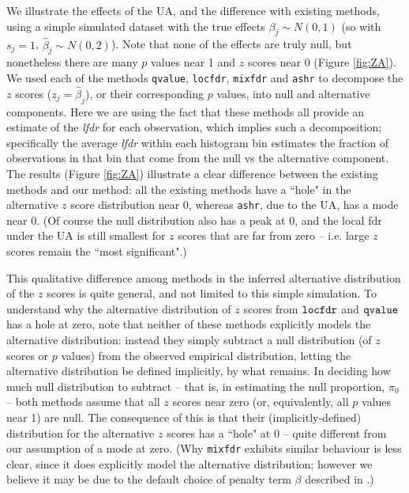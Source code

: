 \documentclass[11pt]{article}
\def\lfdr{\textit{lfdr}}
\def\bhat{\hat{\beta}}
\def\qvalue{{\tt qvalue}\xspace}
\def\locfdr{{\tt locfdr}\xspace}
\def\mixfdr{{\tt mixfdr}\xspace}
\def\ashr{{\tt ashr}\xspace}
\begin{document}
We illustrate the effects of the UA, and the difference with existing methods, using a simple simulated dataset
 with the true effects $\beta_j \sim N(0,1)$ (so with $s_j=1$, $\bhat_j  \sim N(0,2)$). Note that none of the effects are truly null,
but nonetheless there are many $p$ values near 1 and $z$ scores near 0 (Figure \ref{fig:ZA}).  We used each of the methods
\qvalue, \locfdr, \mixfdr and \ashr to decompose the $z$ scores ($z_j = \bhat_j$), or their corresponding $p$ values, into null and alternative components.
Here we are using the fact that these methods all provide an estimate of the \lfdr{} for each observation, which
implies such a decomposition;  specifically the average \lfdr{} within each histogram bin estimates the fraction of observations in that bin that come from the null vs the alternative component. The results (Figure \ref{fig:ZA}) illustrate a clear difference between the existing methods and our method:
all the existing methods have a ``hole"  in the alternative $z$ score distribution near 0, whereas \ashr, due to the UA, has a mode near 0.
(Of course the null distribution also has a peak at 0, and the local fdr 
 under the UA is still smallest for $z$ scores that are far from zero -- i.e. large $z$ scores remain the ``most significant".)
 
This qualitative difference among methods in the inferred alternative distribution of the $z$ scores is quite general, and 
not limited to this simple simulation. To understand why the alternative distribution of $z$ scores from $\locfdr$ and $\qvalue$ has a hole at zero, note that neither
of these methods explicitly models the alternative distribution: instead they simply subtract a null distribution (of $z$ scores or $p$ values) from the observed empirical distribution, letting the alternative
distribution be defined implicitly, by what remains.
 In deciding how much null distribution to subtract -- that is, in estimating the null proportion, $\pi_0$ -- 
 both methods assume that all $z$ scores near zero (or, equivalently,
all $p$ values near 1) are null. The consequence of this is that their (implicitly-defined) distribution for the alternative $z$ scores has 
a ``hole" at 0 -- quite different from our assumption of a mode at zero. (Why \mixfdr exhibits similar behaviour is less clear, since it does explicitly
model the alternative distribution; however we believe it may be due to the default choice of penalty term $\beta$ described in \cite{muralidharan2010empirical}.)
\end{document}
